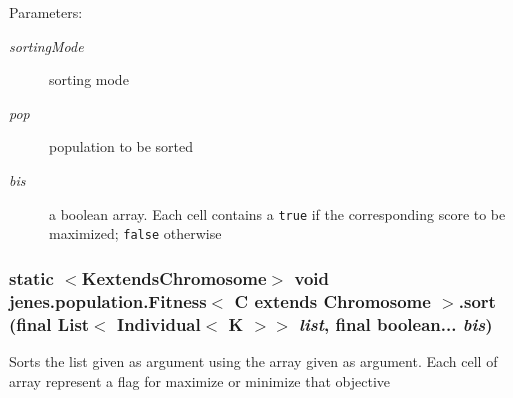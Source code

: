 \begin{Desc}
\item[Parameters:]
\begin{description}
\item[{\em sortingMode}]sorting mode \item[{\em pop}]population to be sorted \item[{\em bis}]a boolean array. Each cell contains a {\tt true} if the corresponding score to be maximized; {\tt false} otherwise \end{description}
\end{Desc}
\hypertarget{classjenes_1_1population_1_1_fitness_3_01_c_01extends_01_chromosome_01_4_160b6471e47adc4386c1dd4122a50e25}{
\subsubsection[sort]{\setlength{\rightskip}{0pt plus 5cm}static $<$KextendsChromosome$>$ void jenes.population.Fitness$<$ C extends Chromosome $>$.sort (final List$<$ Individual$<$ K $>$$>$ {\em list}, \/  final boolean... {\em bis})}}
\label{classjenes_1_1population_1_1_fitness_3_01_c_01extends_01_chromosome_01_4_160b6471e47adc4386c1dd4122a50e25}


Sorts the list given as argument using the array given as argument. Each cell of array represent a flag for maximize or minimize that objective

